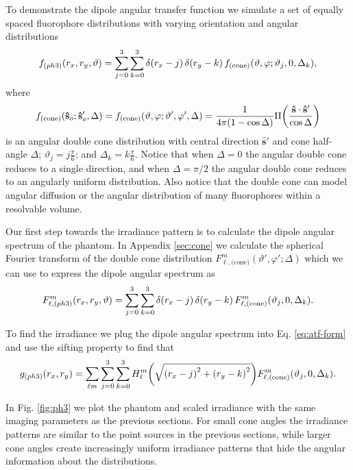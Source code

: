 \documentclass[]{osa-article}
\let\originalleft\left
\let\originalright\right
\renewcommand{\left}{\mathopen{}\mathclose\bgroup\originalleft}
\renewcommand{\right}{\aftergroup\egroup\originalright}
\providecommand{\so}{\mathbf{\hat{s}}_o}
\providecommand{\mh}[1]{\mathbf{\hat{#1}}}
\begin{document}
 To demonstrate the dipole angular transfer function we simulate a set of
 equally spaced fluorophore distributions with varying orientation and angular
 distributions
 \begin{align}
   f_{(ph3)}(r_x, r_y, \vartheta) = \sum_{j=0}^3 \sum_{k=0}^3 \delta\left(r_x - j\right)\, \delta\left(r_y - k\right)\, f_{\text{(cone)}}\left(\vartheta, \varphi; \vartheta_j, 0, \Delta_k\right),\label{eq:phantom3}
 \end{align}
 where
 \begin{align}
   f_{\text{(cone)}}(\so; \so', \Delta) = f_{\text{(cone)}}(\vartheta, \varphi; \vartheta', \varphi', \Delta) = \frac{1}{4\pi(1 - \cos\Delta)}\Pi\left(\frac{\mh{s}\cdot\mh{s}'}{\cos\Delta}\right)
 \end{align}
 is an angular double cone distribution with central direction $\mh{s}'$ and
 cone half-angle $\Delta$; $\vartheta_j = j\frac{\pi}{6}$; and
 $\Delta_k = k\frac{\pi}{6}$. Notice that when $\Delta = 0$ the angular double
 cone reduces to a single direction, and when $\Delta = \pi/2$ the angular
 double cone reduces to an angularly uniform distribution. Also notice that the
 double cone can model angular diffusion or the angular distribution of many
 fluorophores within a resolvable volume.
 
 Our first step towards the irradiance pattern is to calculate the dipole
 angular spectrum of the phantom. In Appendix \ref{sec:cone} we calculate the
 spherical Fourier transform of the double cone distribution
 $F^m_{\ell,\text{(cone)}}(\vartheta', \varphi'; \Delta)$ which we can use to
 express the dipole angular spectrum as
 \begin{align}
   F^{m}_{\ell,(ph3)}(r_x, r_y, \vartheta) = \sum_{j=0}^3 \sum_{k=0}^3 \delta\left(r_x - j\right)\, \delta\left(r_y - k\right)\, F^m_{\ell,\text{(cone)}}\left(\vartheta_j, 0, \Delta_k\right).\label{eq:phantom3spect}
 \end{align}

 To find the irradiance we plug the dipole angular spectrum into Eq.
 \eqref{eq:atf-form} and use the sifting property to find that
 \begin{align}
   g_{(ph3)}(r_x, r_y) = \sum_{\ell m}\sum_{j=0}^3 \sum_{k=0}^3 H_\ell^m\left(\sqrt{\left(r_x - j\right)^2 + \left(r_y - k\right)^2}\right) F^m_{\ell,\text{(cone)}}\left(\vartheta_j, 0, \Delta_k\right).\label{eq:phantom3irr}
 \end{align}

 In Fig. \ref{fig:ph3} we plot the phantom and scaled irradiance with the same
 imaging parameters as the previous sections. For small cone angles the
 irradiance patterns are similar to the point sources in the previous sections,
 while larger cone angles create increasingly uniform irradiance patterns that
 hide the angular information about the distributions.
\end{document}
